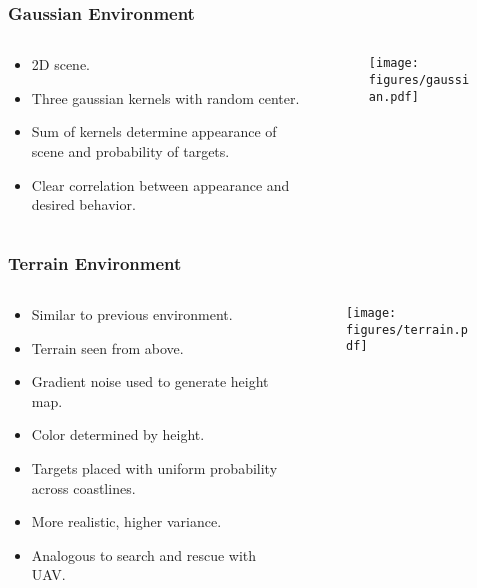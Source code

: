 \begin{frame}
    \frametitle{Gaussian Environment}
    \begin{columns}
        \begin{column}{0.5\textwidth}
            \begin{itemize}
                \item 2D scene.
                \item Three gaussian kernels with random center.
                \item Sum of kernels determine appearance of scene and probability of targets.
                \item Clear correlation between appearance and desired behavior.
            \end{itemize}
        \end{column}
        \begin{column}{0.5\textwidth}
            \begin{figure}
                \centering
                \texttt{[image: figures/gaussian.pdf]}
            \end{figure}
        \end{column}
    \end{columns}    
\end{frame}

\begin{frame}
    \frametitle{Terrain Environment}
    \begin{columns}
        \begin{column}{0.5\textwidth}
            \begin{itemize}
                \item Similar to previous environment.
                \item Terrain seen from above.
                \item Gradient noise used to generate height map.
                \item Color determined by height.
                \item Targets placed with uniform probability across coastlines.
                \item More realistic, higher variance.
                \item Analogous to search and rescue with UAV.
            \end{itemize}
        \end{column}
        \begin{column}{0.5\textwidth}
            \begin{figure}
                \centering
                \texttt{[image: figures/terrain.pdf]}
            \end{figure}
        \end{column}
    \end{columns}   
\end{frame}

